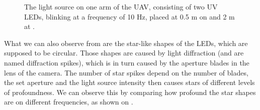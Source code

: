 \begin{figure}[H]
	\centering
	\caption{
  The light source on one arm of the UAV, consisting of two UV LEDs, blinking at a frequency of 10 Hz,
  placed at 0.5 m on  and 2 m at .
  }
	\label{fig:leds}
\end{figure}
What we can also observe from  are the star-like shapes of the LEDs, which are supposed to be circular.
Those shapes are caused by light diffraction (and are named diffraction spikes), which is in turn caused by the aperture
blades in the lens of the camera. The number
of star spikes depend on the number of blades, the set aperture and the light source intensity then causes stars of different
levels of profoundness.\cite{lendermann2018computational} We can observe this by comparing how profound the star shapes are on different
frequencies, as shown on .

